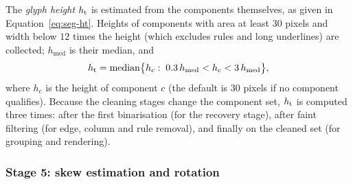 The \emph{glyph height} $h_{\mathrm{t}}$ is estimated from the components themselves, as given in Equation~\ref{eq:seg-ht}.
Heights of components with area at least 30 pixels and width below $12$ times the height (which excludes rules and long underlines) are collected; $h_{\mathrm{med}}$ is their median, and
\begin{equation}
h_{\mathrm{t}}=\mathrm{median}\bigl\{h_c:\;0.3\,h_{\mathrm{med}}<h_c<3\,h_{\mathrm{med}}\bigr\},
\label{eq:seg-ht}
\end{equation}
where $h_c$ is the height of component $c$ (the default is 30 pixels if no component qualifies).
Because the cleaning stages change the component set, $h_{\mathrm{t}}$ is computed three times: after the first binarisation (for the recovery stage), after faint filtering (for edge, column and rule removal), and finally on the cleaned set (for grouping and rendering).


\subsubsection{Stage 5: skew estimation and rotation}

